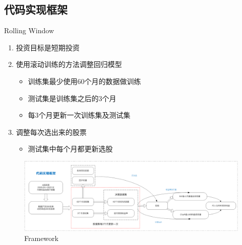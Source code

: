 \documentclass[CJK,aspectratio=43]{beamer}  %
\begin{document}
\subsection{代码实现框架}
\begin{frame}{Rolling Window}
	\begin{enumerate}
		\item 投资目标是短期投资
		\item 使用滚动训练的方法调整回归模型
		\begin{itemize}
			\item 训练集最少使用60个月的数据做训练
			\item 测试集是训练集之后的3个月
			\item 每3个月更新一次训练集及测试集
		\end{itemize}
		\item 调整每次选出来的股票
		\begin{itemize}
			\item 测试集中每个月都更新选股
		\end{itemize}
	\end{enumerate}
	\begin{figure}
		\centering
		\includegraphics[width=1\linewidth]{pic/framework}
		\caption{Framework}
		\label{fig:framework}
	\end{figure}
\end{frame}
\end{document}
